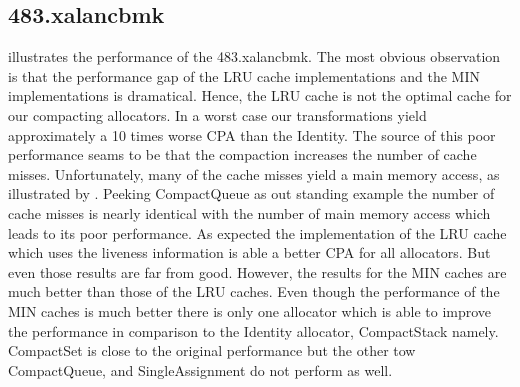\documentclass[onecolumn, openright, master, english, signatures]{dbrgrptt}
\begin{document}
\subsection{483.xalancbmk}
 illustrates the performance of the 483.xalancbmk. The most obvious observation is that the performance gap of the \ac{LRU} cache implementations and the \ac{MIN} implementations is dramatical. Hence, the \ac{LRU} cache is not the optimal cache for our compacting allocators. In a worst case our transformations yield approximately a 10 times worse \ac{CPA} than the Identity. The source of this poor performance seams to be that the compaction increases the number of cache misses. Unfortunately, many of the cache misses yield a main memory access, as illustrated by . Peeking CompactQueue as out standing example the number of cache misses is nearly identical with the number of main memory access which leads to its poor performance. As expected the implementation of the \ac{LRU} cache which uses the liveness information is able a better \ac{CPA} for all allocators. But even those results are far from good. However, the results for the \ac{MIN} caches are much better than those of the \ac{LRU} caches. Even though the performance of the \ac{MIN} caches is much better there is only one allocator which is able to improve the performance in comparison to the Identity allocator, CompactStack namely. CompactSet is close to the original performance but the other tow CompactQueue, and SingleAssignment do not perform as well.
\end{document}
